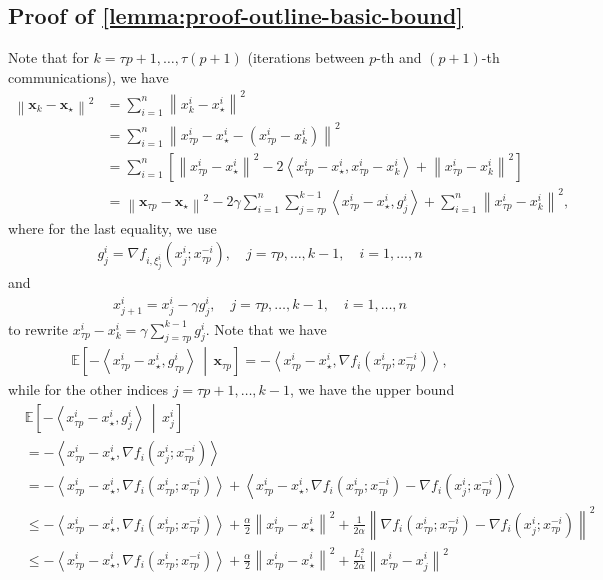 \documentclass{article}
\newcommand{\vx}{{\mathbf{x}}}
\newcommand{\inprod}[2]{\left\langle #1,#2 \right\rangle}
\newcommand{\sqnorm}[1]{\left\| #1 \right\|^2}
\theoremstyle{plain}
\theoremstyle{remark}
\begin{document}
\subsection{Proof of \cref{lemma:proof-outline-basic-bound}}

Note that for $k=\tau p+1, \dots, \tau(p+1)$ (iterations between $p$-th and $(p+1)$-th communications), we have 
\begin{align}
    \sqnorm{\vx_k - \vx_\star} & = \sum_{i=1}^n \sqnorm{x_k^i - x_{\star}^i} \nonumber \\
    & = \sum_{i=1}^n \sqnorm{x_{\tau p}^i - x_{\star}^i - \left( x_{\tau p}^i - x_{k}^i \right)} \nonumber \\
    & = \sum_{i=1}^n \left[ \sqnorm{x_{\tau p}^i - x_{\star}^i} - 2\inprod{x_{\tau p}^i - x_{\star}^i}{x_{\tau p}^i - x_{k}^i} + \sqnorm{x_{\tau p}^i - x_{k}^i} \right] \nonumber \\
    & = \sqnorm{\vx_{\tau p} - \vx_\star} - 2\gamma \sum_{i=1}^n \sum_{j=\tau p}^{k-1} \inprod{x_{\tau p}^i - x_\star^i}{g_j^i} + \sum_{i=1}^n \sqnorm{x_{\tau p}^i - x_{k}^i} , \label{eqn:stochastic-rate-proof-first-identity}
\end{align}
where for the last equality, we use
\begin{align*}
    g_j^i = \nabla f_{i,\xi_j^i} (x_j^i; x_{\tau p}^{-i}), \quad j=\tau p, \dots, k-1, \quad i=1,\dots,n
\end{align*}
and
\begin{align*}
    x_{j+1}^i = x_j^i - \gamma g_j^i , \quad j=\tau p, \dots, k-1, \quad i=1,\dots,n
\end{align*}
to rewrite $x_{\tau p}^i - x_k^i = \gamma \sum_{j=\tau p}^{k-1} g_j^i$.
Note that we have 
\begin{align*}
    \mathbb{E} \left[ -\inprod{x_{\tau p}^i - x_\star^i}{g_{\tau p}^i} \,\middle|\, \vx_{\tau p} \right] = -\inprod{x_{\tau p}^i - x_\star^i}{\nabla f_i (x_{\tau p}^i; x_{\tau p}^{-i})} ,    
\end{align*}
while for the other indices
$j=\tau p+1, \dots, k-1$, we have the upper bound
\begin{align*}
    & \mathbb{E} \left[ -\inprod{x_{\tau p}^i - x_\star^i}{g_j^i} \,\middle|\, x_j^i \right] \\ & = -\inprod{x_{\tau p}^i - x_\star^i}{\nabla f_i (x_j^i; x_{\tau p}^{-i})} \\
    & = -\inprod{x_{\tau p}^i - x_\star^i}{\nabla f_i (x_{\tau p}^i; x_{\tau p}^{-i})} + \inprod{x_{\tau p}^i - x_\star^i}{\nabla f_i (x_{\tau p}^i; x_{\tau p}^{-i}) - \nabla f_i (x_{j}^i; x_{\tau p}^{-i})} \\
    & \le -\inprod{x_{\tau p}^i - x_\star^i}{\nabla f_i (x_{\tau p}^i; x_{\tau p}^{-i})} + \frac{\alpha}{2} \sqnorm{x_{\tau p}^i - x_\star^i} + \frac{1}{2\alpha} \sqnorm{\nabla f_i (x_{\tau p}^i; x_{\tau p}^{-i}) - \nabla f_i (x_{j}^i; x_{\tau p}^{-i})} \\
    & \le -\inprod{x_{\tau p}^i - x_\star^i}{\nabla f_i (x_{\tau p}^i; x_{\tau p}^{-i})} + \frac{\alpha}{2} \sqnorm{x_{\tau p}^i - x_\star^i} + \frac{L_i^2}{2\alpha} \sqnorm{x_{\tau p}^i - x_{j}^i}
\end{align*}
\end{document}

